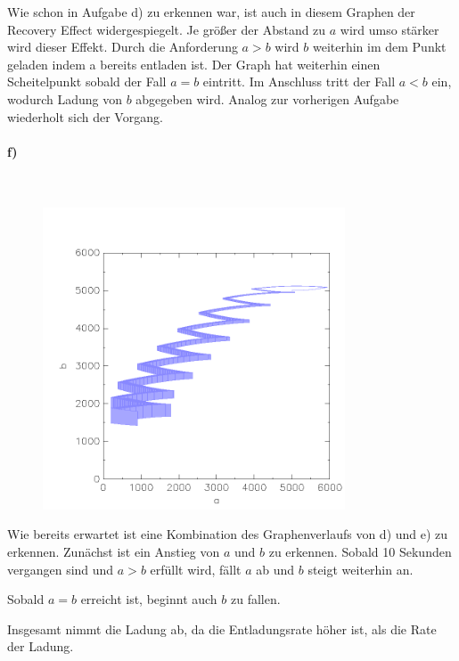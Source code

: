 Wie schon in Aufgabe d) zu erkennen war, ist auch in diesem Graphen der Recovery Effect widergespiegelt. Je größer der Abstand zu $a$ wird umso stärker wird dieser Effekt. Durch die Anforderung $a>b$ wird $b$ weiterhin im dem Punkt geladen indem a bereits entladen ist. Der Graph hat weiterhin einen Scheitelpunkt sobald der Fall $a=b$ eintritt. Im Anschluss tritt der Fall $a<b$ ein, wodurch Ladung von $b$ abgegeben wird. Analog zur vorherigen Aufgabe wiederholt sich der Vorgang. 

\paragraph{f)}\mbox{} \\

\begin{figure}[H]
	\centering
	\includegraphics[width=0.8\textwidth]{Aufgabe_f).png}
\end{figure}

Wie bereits erwartet ist eine Kombination des Graphenverlaufs von d) und e) zu erkennen. Zunächst ist ein Anstieg von $a$ und $b$ zu erkennen. Sobald 10 Sekunden vergangen sind und $a>b$ erfüllt wird, fällt $a$ ab und $b$ steigt weiterhin an. 

Sobald $a=b$ erreicht ist, beginnt auch $b$ zu fallen. 

Insgesamt nimmt die Ladung ab, da die Entladungsrate höher ist, als die Rate der Ladung.


